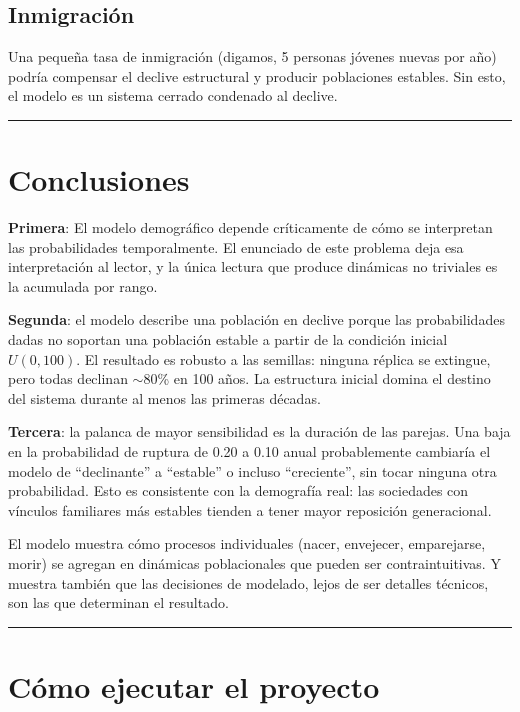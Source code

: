 \documentclass[12pt,a4paper]{article}
\begin{document}
\subsection{Inmigración}

Una pequeña tasa de inmigración (digamos, 5 personas jóvenes nuevas por año) podría compensar el declive estructural y producir poblaciones estables. Sin esto, el modelo es un sistema cerrado condenado al declive.

\begin{center}\rule{0.7\linewidth}{0.4pt}\end{center}

\section{Conclusiones}

\textbf{Primera}: El modelo demográfico depende críticamente de cómo se interpretan las probabilidades temporalmente. El enunciado de este problema deja esa interpretación al lector, y la única lectura que produce dinámicas no triviales es la acumulada por rango.

\textbf{Segunda}: el modelo describe una población en declive porque las probabilidades dadas no soportan una población estable a partir de la condición inicial $U(0, 100)$. El resultado es robusto a las semillas: ninguna réplica se extingue, pero todas declinan $\sim$80\% en 100 años. La estructura inicial domina el destino del sistema durante al menos las primeras décadas.

\textbf{Tercera}: la palanca de mayor sensibilidad es la duración de las parejas. Una baja en la probabilidad de ruptura de 0.20 a 0.10 anual probablemente cambiaría el modelo de ``declinante'' a ``estable'' o incluso ``creciente'', sin tocar ninguna otra probabilidad. Esto es consistente con la demografía real: las sociedades con vínculos familiares más estables tienden a tener mayor reposición generacional.

El modelo muestra cómo procesos individuales (nacer, envejecer, emparejarse, morir) se agregan en dinámicas poblacionales que pueden ser contraintuitivas. Y muestra también que las decisiones de modelado, lejos de ser detalles técnicos, son las que determinan el resultado.

\begin{center}\rule{0.7\linewidth}{0.4pt}\end{center}

\section{Cómo ejecutar el proyecto}
\end{document}
